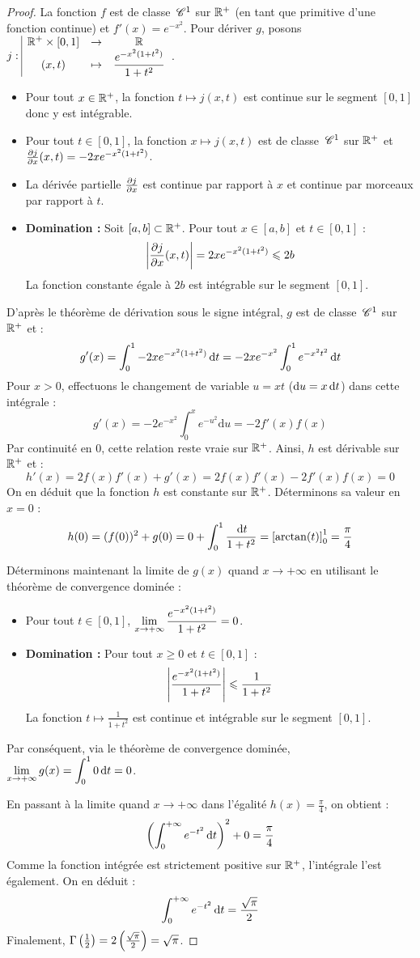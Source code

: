 \begin{proof}
    La fonction $f$ est de classe $\,\mathscr C^{1}$ sur $\mathbb{R}^+$ (en tant que primitive d'une fonction continue) et $f'(x) = e^{-x^2}$.
    Pour dériver $g$, posons $j: \space \begin{array}{|ccc} \displaystyle \mathbb{R}^+ \times [0,1] & \to & \displaystyle \mathbb{R} \\ \displaystyle (x,t) & \mapsto & \displaystyle \frac{e^{-x^2(1+t^2)}}{1+t^2} \end{array}$.
    \begin{itemize}
        \item Pour tout $x \in \mathbb{R}^+$, la fonction $t \mapsto j(x,t)$ est continue sur le segment $[0,1]$ donc y est intégrable.
        \item Pour tout $t \in [0,1]$, la fonction $x \mapsto j(x,t)$ est de classe $\,\mathscr C^{1}$ sur $\mathbb{R}^+$ et $\frac{\partial j}{\partial x}(x,t) = -2x e^{-x^2(1+t^2)}$.
        \item La dérivée partielle $\frac{\partial j}{\partial x}$ est continue par rapport à $x$ et continue par morceaux par rapport à $t$.
        \item \textbf{Domination :} Soit $[a,b] \subset \mathbb{R}^+$. Pour tout $x \in [a,b]$ et $t \in [0,1]$ :
        \[ \left|\frac{\partial j}{\partial x}(x,t)\right| = 2x e^{-x^2(1+t^2)} \leqslant 2b \]
        La fonction constante égale à $2b$ est intégrable sur le segment $[0,1]$.
    \end{itemize}
    D'après le théorème de dérivation sous le signe intégral, $g$ est de classe $\,\mathscr C^{1}$ sur $\mathbb{R}^+$ et :
    \[ g'(x) = \int_0^1 -2x e^{-x^2(1+t^2)} \,\mathrm{d}t = -2x e^{-x^2} \int_0^1 e^{-x^2 t^2} \,\mathrm{d}t \]
    Pour $x > 0$, effectuons le changement de variable $u = xt$ ($\mathrm{d}u = x\,\mathrm{d}t$) dans cette intégrale :
    \[ g'(x) = -2 e^{-x^2} \int_0^x e^{-u^2} \mathrm{d}u = -2 f'(x) f(x) \]
    Par continuité en $0$, cette relation reste vraie sur $\mathbb{R}^+$.
    Ainsi, $h$ est dérivable sur $\mathbb{R}^+$ et :
    \[ h'(x) = 2 f(x) f'(x) + g'(x) = 2 f(x) f'(x) - 2 f'(x) f(x) = 0 \]
    On en déduit que la fonction $h$ est constante sur $\mathbb{R}^+$. Déterminons sa valeur en $x=0$ :
    \[ h(0) = (f(0))^2 + g(0) = 0 + \int_0^1 \frac{\,\mathrm{d}t}{1+t^2} = \left[\arctan(t)\right]_0^1 = \frac{\pi}{4} \]

    Déterminons maintenant la limite de $g(x)$ quand $x \to +\infty$ en utilisant le théorème de convergence dominée :
    \begin{itemize}
        \item Pour tout $t \in [0,1]$, $\displaystyle\lim_{x \to +\infty} \frac{e^{-x^2(1+t^2)}}{1+t^2} = 0$.
        \item \textbf{Domination :} Pour tout $x \geqslant 0$ et $t \in [0,1]$ :
        \[ \left|\frac{e^{-x^2(1+t^2)}}{1+t^2}\right| \leqslant \frac{1}{1+t^2} \]
        La fonction $t \mapsto \frac{1}{1+t^2}$ est continue et intégrable sur le segment $[0,1]$.
    \end{itemize}
    Par conséquent, via le théorème de convergence dominée, $\displaystyle\lim_{x \to +\infty} g(x) = \int_0^1 0 \,\mathrm{d}t = 0$.

    En passant à la limite quand $x \to +\infty$ dans l'égalité $h(x) = \frac{\pi}{4}$, on obtient :
    \[ \left(\int_0^{+\infty} e^{-t^2} \,\mathrm{d}t\right)^2 + 0 = \frac{\pi}{4} \]
    Comme la fonction intégrée est strictement positive sur $\mathbb{R}^+$, l'intégrale l'est également. On en déduit :
    \[ \int_0^{+\infty} e^{-t^2} \,\mathrm{d}t = \frac{\sqrt{\pi}}{2} \]
    Finalement, $\Gamma\left(\frac{1}{2}\right) = 2 \left(\frac{\sqrt{\pi}}{2}\right) = \sqrt{\pi}$.
\end{proof}
